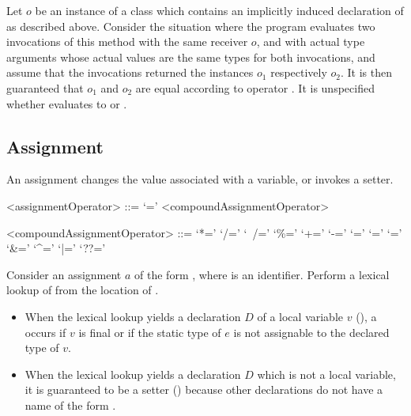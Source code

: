 \documentclass[makeidx]{article}
\begin{document}
{{\LMHash{}%
Let $o$ be an instance of a class which contains
an implicitly induced declaration of \gmiName{}
as described above.
%
Consider the situation where the program evaluates
two invocations of this method with the same receiver $o$,
and with actual type arguments whose actual values are
the same types  for both invocations,
and assume that the invocations returned
the instances $o_1$ respectively $o_2$.
%
It is then guaranteed that $o_1$ and $o_2$ are equal
according to operator \lit{==}.
It is unspecified whether
evaluates to \TRUE{} or \FALSE.

} %



\subsection{Assignment}

\LMHash{}%
An assignment changes the value associated with a variable,
or invokes a setter.

\begin{grammar}
<assignmentOperator> ::= `='
  \alt <compoundAssignmentOperator>

<compoundAssignmentOperator> ::= `*='
  \alt `/='
  \alt `~/='
  \alt `\%='
  \alt `+='
  \alt `-='
  \alt `\ltlt='
  \alt `\gtgtgt='
  \alt `\gtgt='
  \alt `\&='
  \alt `^='
  \alt `|='
  \alt `??='
\end{grammar}

\LMHash{}%
Consider an assignment $a$ of the form ,
where \id{} is an identifier.
Perform a lexical lookup of \code{\id=} from the location of \id.

\begin{itemize}
\item
  When the lexical lookup yields a declaration $D$ of a local variable $v$
  (),
  a  occurs if $v$ is final
  or if the static type of $e$ is not assignable to the declared type of $v$.
\item
  When the lexical lookup yields a declaration $D$
  which is not a local variable,
  it is guaranteed to be a setter
  ()
  because other declarations do not have a name
  of the form \code{\id=}.


\end{itemize}}
\end{document}
